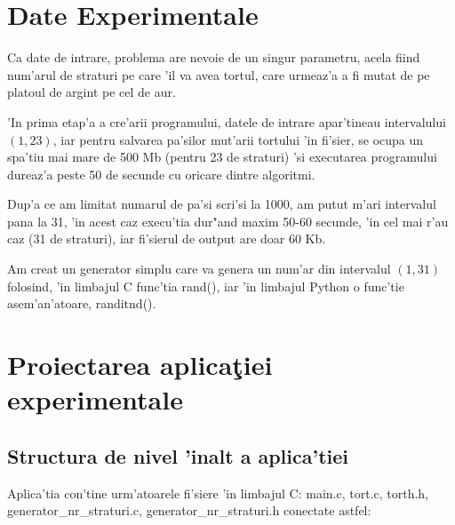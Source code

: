 \documentclass{article}
\begin{document}
\section{Date Experimentale}

Ca date de intrare, problema are nevoie de un singur parametru, acela fiind num'arul de straturi pe care 'il va avea tortul, care urmeaz'a a fi mutat de pe platoul de argint pe cel de aur.

'In prima etap'a a cre'arii programului, datele de intrare apar'tineau intervalului $(1,23)$, iar pentru salvarea pa'silor mut'arii tortului 'in fi'sier, se ocupa un spa'tiu mai mare de 500 Mb (pentru 23 de straturi) 'si executarea programului dureaz'a peste 50 de secunde cu oricare dintre algoritmi.

Dup'a ce am limitat numarul de pa'si scri'si la 1000, am putut m'ari intervalul pana la 31, 'in acest caz execu'tia dur"and maxim 50-60 secunde, 'in cel mai r'au caz (31 de straturi), iar fi'sierul de output are doar 60 Kb.

Am creat un generator simplu care va genera un num'ar din intervalul $(1,31)$ folosind, 'in limbajul C func'tia rand(), iar 'in limbajul Python o func'tie asem'an'atoare, randitnd().


\section{Proiectarea aplica\c{t}iei experimentale}

\subsection{Structura de nivel 'inalt a aplica'tiei}

Aplica'tia con'tine urm'atoarele fi'siere 'in limbajul C: main.c, tort.c, torth.h, generator\_nr\_straturi.c, generator\_nr\_straturi.h conectate astfel:
\end{document}
